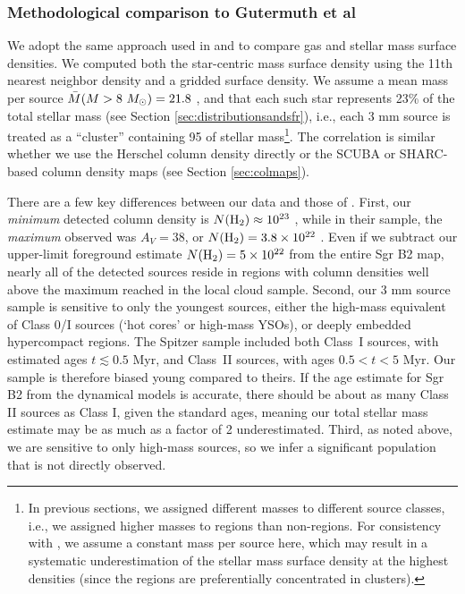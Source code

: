 \documentclass[twocolumn]{aastex61}
\begin{document}
\subsubsection{Methodological comparison to Gutermuth et al}
\label{sec:gutermuthmethods}
We adopt the same approach used in \citet{Gutermuth2009a} and
\citet{Gutermuth2011a} to compare gas and stellar mass surface densities.  We
computed both the star-centric mass surface density using the 11th nearest
neighbor density and a gridded surface density.  We assume a mean mass per
source $\bar{M}(M>8~M_{\odot})=21.8$ \msun, and that each such star represents 23\%
of the total stellar mass (see Section \ref{sec:distributionsandsfr}), i.e.,
each 3 mm source is treated as a ``cluster'' containing 95 \msun of stellar
mass\footnote{In previous
sections, we assigned different masses to different source classes, i.e., we
assigned higher masses to \hii regions than non-\hii regions.  For consistency
with \citet{Gutermuth2011a}, we assume a constant mass per source here, which
may result in a systematic underestimation of the stellar mass surface density
at the highest densities (since the \hii regions are preferentially
concentrated in clusters).}. The correlation is similar whether we use the
Herschel column density directly or the SCUBA or SHARC-based column density
maps (see Section \ref{sec:colmaps}).  

There are a few key differences between our data and those of
\citet{Gutermuth2011a}.  First, our \emph{minimum} detected column density is
$N(\textrm{H}_{2})\approx10^{23}$ \persc, while in their sample, the \emph{maximum}
observed was $A_V=38$, or $N(\textrm{H}_{2})=3.8\times10^{22}$ \persc.  Even if we subtract our
upper-limit foreground estimate $N(\textrm{H}_{2})=5\times10^{22}$ \persc from the entire Sgr B2
map, nearly all of the detected sources reside in regions with column densities
well above the maximum reached in the local cloud sample.  Second, our 3 mm
source sample is sensitive to only the youngest sources, either the high-mass
equivalent of Class 0/I sources (`hot cores' or high-mass YSOs), or deeply embedded
hypercompact \hii regions.  The Spitzer sample included both Class~I sources,
with estimated ages $t\lesssim0.5$ Myr, and Class~II sources, with ages $0.5 <
t < 5$ Myr.  Our sample is therefore biased young compared to theirs.  If the
age estimate for Sgr B2 from the dynamical models
\citep{Kruijssen2015a} is accurate, there should be about as many
Class II sources as Class I, given the standard ages, meaning our total stellar
mass estimate may be as much as a factor of 2 underestimated.  Third, as noted
above, we are sensitive to only high-mass sources, so we infer a significant
population that is not directly observed.
\end{document}
